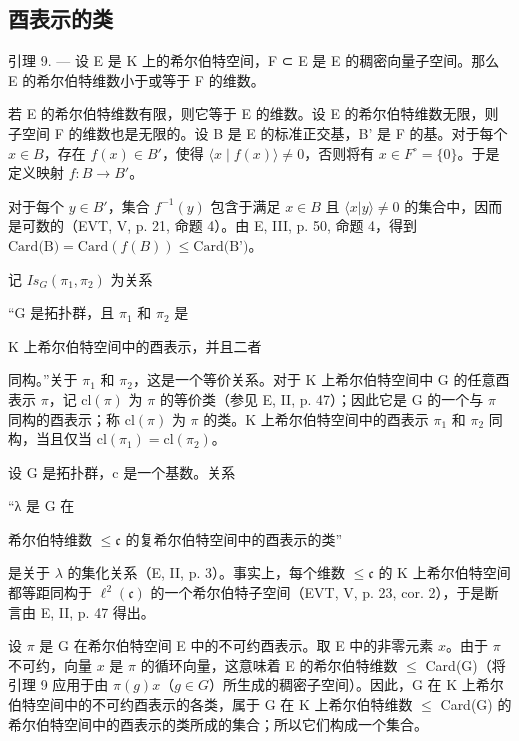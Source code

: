 \subsection{酉表示的类}

引理 9. --- 设 E 是 K 上的希尔伯特空间，F ⊂ E 是 E 的稠密向量子空间。那么 E 的希尔伯特维数小于或等于 F 的维数。

若 E 的希尔伯特维数有限，则它等于 E 的维数。设 E 的希尔伯特维数无限，则子空间 F 的维数也是无限的。设 B 是 E 的标准正交基，B' 是 F 的基。对于每个 \(x \in B\)，存在 \(f(x) \in B'\)，使得 \(\langle x \mid f(x) \rangle \neq 0\)，否则将有 \(x \in F^{\circ} = \{0\}\)。于是定义映射 \(f: B \to B'\)。

对于每个 \(y \in B'\)，集合 \(f^{-1}(y)\) 包含于满足 \(x \in B\) 且 \(\langle x | y \rangle \neq 0\) 的集合中，因而是可数的（EVT, V, p. 21, 命题 4）。由 E, III, p. 50, 命题 4，得到 \(\text{Card(B)} = \text{Card}(f(B)) \leqslant \text{Card(B')}\)。

记 \(Is_{G}(\pi_{1},\pi_{2})\) 为关系

“G 是拓扑群，且 \(\pi_{1}\) 和 \(\pi_{2}\) 是

K 上希尔伯特空间中的酉表示，并且二者

同构。”关于 \(\pi_{1}\) 和 \(\pi_{2}\)，这是一个等价关系。对于 K 上希尔伯特空间中 G 的任意酉表示 \(\pi\)，记 \(\mathrm{cl}(\pi)\) 为 \(\pi\) 的等价类（参见 E, II, p. 47）；因此它是 G 的一个与 \(\pi\) 同构的酉表示；称 \(\mathrm{cl}(\pi)\) 为 \(\pi\) 的类。K 上希尔伯特空间中的酉表示 \(\pi_{1}\) 和 \(\pi_{2}\) 同构，当且仅当 \(\mathrm{cl}(\pi_{1}) = \mathrm{cl}(\pi_{2})\)。

设 G 是拓扑群，c 是一个基数。关系

“λ 是 G 在

希尔伯特维数 \(\leqslant\mathfrak{c}\) 的复希尔伯特空间中的酉表示的类”

是关于 \(\lambda\) 的集化关系（E, II, p. 3）。事实上，每个维数 \(\leqslant \mathfrak{c}\) 的 K 上希尔伯特空间都等距同构于 \(\ell^2 (\mathfrak{c})\) 的一个希尔伯特子空间（EVT, V, p. 23, cor. 2），于是断言由 E, II, p. 47 得出。

设 \(\pi\) 是 G 在希尔伯特空间 E 中的不可约酉表示。取 E 中的非零元素 \(x\)。由于 \(\pi\) 不可约，向量 \(x\) 是 \(\pi\) 的循环向量，这意味着 E 的希尔伯特维数 \(\leqslant\) Card(G)（将引理 9 应用于由 \(\pi(g)x\)（\(g \in G\)）所生成的稠密子空间）。因此，G 在 K 上希尔伯特空间中的不可约酉表示的各类，属于 G 在 K 上希尔伯特维数 \(\leqslant\) Card(G) 的希尔伯特空间中的酉表示的类所成的集合；所以它们构成一个集合。

